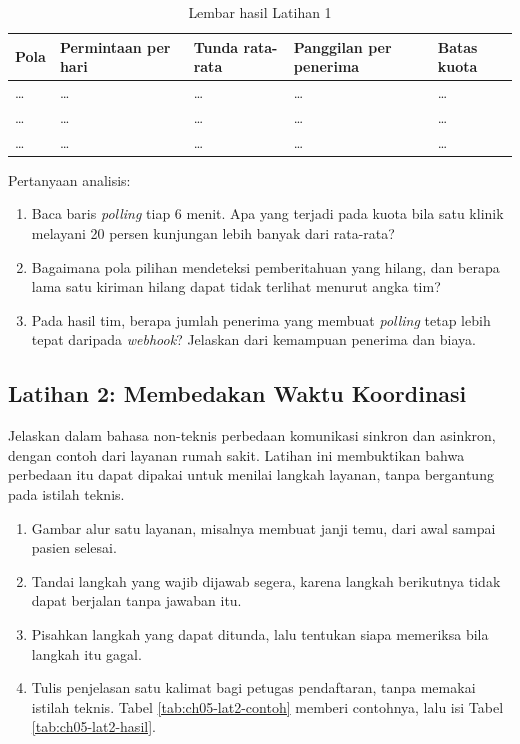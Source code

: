 \begin{table}[!htb]
  \centering
  \caption{Lembar hasil Latihan 1}
  \label{tab:ch05-lat1-hasil}
  \small
  \begin{tabularx}{\textwidth}{UV{2.0cm}V{1.7cm}V{1.7cm}V{1.6cm}}
    \hline
    \textbf{Pola} & \textbf{Permintaan per hari} & \textbf{Tunda rata-rata} & \textbf{Panggilan per penerima} & \textbf{Batas kuota} \\ \hline
    \dots & \dots & \dots & \dots & \dots \\ \hline
    \dots & \dots & \dots & \dots & \dots \\ \hline
    \dots & \dots & \dots & \dots & \dots \\ \hline
  \end{tabularx}
\end{table}

Pertanyaan analisis:
\begin{enumerate}
  \item Baca baris \textit{polling} tiap 6 menit. Apa yang terjadi pada kuota bila satu klinik melayani 20 persen kunjungan lebih banyak dari rata-rata?
  \item Bagaimana pola pilihan mendeteksi pemberitahuan yang hilang, dan berapa lama satu kiriman hilang dapat tidak terlihat menurut angka tim?
  \item Pada hasil tim, berapa jumlah penerima yang membuat \textit{polling} tetap lebih tepat daripada \textit{webhook}? Jelaskan dari kemampuan penerima dan biaya.
\end{enumerate}

\subsection*{Latihan 2: Membedakan Waktu Koordinasi}

Jelaskan dalam bahasa non-teknis perbedaan komunikasi sinkron dan asinkron, dengan contoh dari layanan rumah sakit. Latihan ini membuktikan bahwa perbedaan itu dapat dipakai untuk
menilai langkah layanan, tanpa bergantung pada istilah teknis.

\begin{enumerate}
  \item Gambar alur satu layanan, misalnya membuat janji temu, dari awal sampai pasien selesai.
  \item Tandai langkah yang wajib dijawab segera, karena langkah berikutnya tidak dapat berjalan tanpa jawaban itu.
  \item Pisahkan langkah yang dapat ditunda, lalu tentukan siapa memeriksa bila langkah itu gagal.
  \item Tulis penjelasan satu kalimat bagi petugas pendaftaran, tanpa memakai istilah teknis. Tabel \ref{tab:ch05-lat2-contoh} memberi contohnya, lalu isi
        Tabel \ref{tab:ch05-lat2-hasil}.
\end{enumerate}

